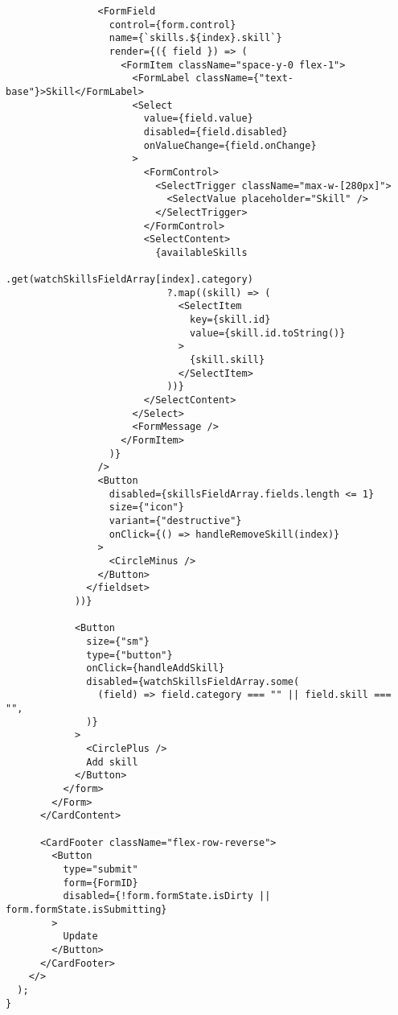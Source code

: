 \begin{verbatim}
                <FormField
                  control={form.control}
                  name={`skills.${index}.skill`}
                  render={({ field }) => (
                    <FormItem className="space-y-0 flex-1">
                      <FormLabel className={"text-base"}>Skill</FormLabel>
                      <Select
                        value={field.value}
                        disabled={field.disabled}
                        onValueChange={field.onChange}
                      >
                        <FormControl>
                          <SelectTrigger className="max-w-[280px]">
                            <SelectValue placeholder="Skill" />
                          </SelectTrigger>
                        </FormControl>
                        <SelectContent>
                          {availableSkills
                            .get(watchSkillsFieldArray[index].category)
                            ?.map((skill) => (
                              <SelectItem
                                key={skill.id}
                                value={skill.id.toString()}
                              >
                                {skill.skill}
                              </SelectItem>
                            ))}
                        </SelectContent>
                      </Select>
                      <FormMessage />
                    </FormItem>
                  )}
                />
                <Button
                  disabled={skillsFieldArray.fields.length <= 1}
                  size={"icon"}
                  variant={"destructive"}
                  onClick={() => handleRemoveSkill(index)}
                >
                  <CircleMinus />
                </Button>
              </fieldset>
            ))}

            <Button
              size={"sm"}
              type={"button"}
              onClick={handleAddSkill}
              disabled={watchSkillsFieldArray.some(
                (field) => field.category === "" || field.skill === "",
              )}
            >
              <CirclePlus />
              Add skill
            </Button>
          </form>
        </Form>
      </CardContent>

      <CardFooter className="flex-row-reverse">
        <Button
          type="submit"
          form={FormID}
          disabled={!form.formState.isDirty || form.formState.isSubmitting}
        >
          Update
        </Button>
      </CardFooter>
    </>
  );
}
\end{verbatim}
